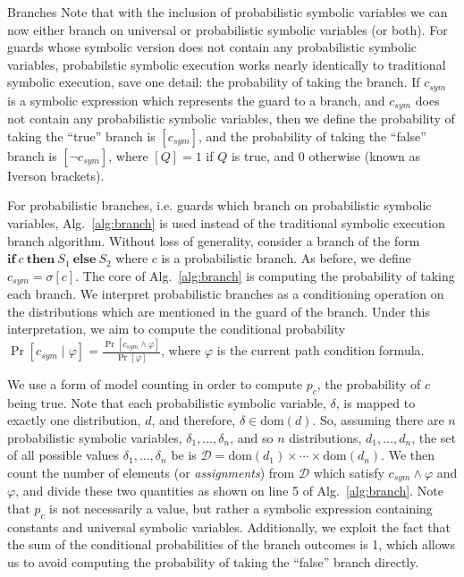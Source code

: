 \documentclass[acmsmall,review]{acmart}\settopmatter{}
\newcommand*\dom[1]{\mathrm{dom}\left( #1 \right)}
\begin{document}
	\begin{paragraph}{Branches}
		Note that with the inclusion of probabilistic symbolic variables we can now either branch on universal or probabilistic symbolic variables (or both).
		For guards whose symbolic version does not contain any probabilistic symbolic variables, probabilstic symbolic execution works nearly identically to traditional symbolic execution, save one detail: the probability of taking the branch. 
		If $c_{sym}$ is a symbolic expression which represents the guard to a branch, and $c_{sym}$ does not contain any probabilistic symbolic variables, then we define the probability of taking the ``true'' branch is $[c_{sym}]$, and the probability of taking the ``false'' branch is $[\neg c_{sym}]$, where $[Q] = 1$ if $Q$ is true, and 0 otherwise (known as Iverson brackets).
		
		
		For probabilistic branches, i.e. guards which branch on probabilistic symbolic variables, Alg.~\ref{alg:branch} is used instead of the traditional symbolic execution branch algorithm.
		Without loss of generality, consider a branch of the form $\mathbf{if}~c~\mathbf{then}~S_1~\mathbf{else}~S_2$ where $c$ is a probabilistic branch.
		As before, we define $c_{sym} = \sigma[c]$.
		The core of Alg.~\ref{alg:branch} is computing the probability of taking each branch.
		We interpret probabilistic branches as a conditioning operation on the distributions which are mentioned in the guard of the branch.
		Under this interpretation, we aim to compute the conditional probability $\Pr[c_{sym} \mid \varphi] = \frac{\Pr[c_{sym}\wedge \varphi]}{\Pr[\varphi]}$, where $\varphi$ is the current path condition formula.  
		
		
		We use a form of model counting in order to compute $p_c$, the probability of $c$ being true.
		Note that each probabilistic symbolic variable, $\delta$, is mapped to exactly one distribution, $d$, and therefore, $\delta \in \dom{d}$.
		So, assuming there are $n$ probabilistic symbolic variables, $\delta_1,\ldots,\delta_n$, and so $n$ distributions, $d_1,\ldots,d_n$, the set of all possible values $\delta_1,\ldots,\delta_n$ be is $\mathcal{D} = \dom{d_1} \times \cdots \times \dom{d_n}$.
		We then count the number of elements (or \textit{assignments}) from $\mathcal{D}$ which satisfy $c_{sym} \wedge \varphi$ and $\varphi$, and divide these two quantities as shown on line 5 of Alg.~\ref{alg:branch}.
		Note that $p_c$ is not necessarily a value, but rather a symbolic expression containing constants and universal symbolic variables.
		Additionally, we exploit the fact that the sum of the conditional probabilities of the branch outcomes is 1, which allows us to avoid computing the probability of taking the ``false'' branch directly.
	\end{paragraph}
	
\end{document}
